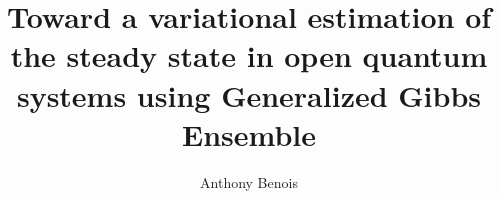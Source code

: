 \documentclass[%
 reprint,
 amsmath,amssymb,
 aps,
]{revtex4-2}
\begin{document}

\title{Toward a variational estimation of the steady state in open quantum systems using Generalized Gibbs Ensemble}


\author{Anthony Benois}




\maketitle



\newcommand{\trace}[1]{\ensuremath{\mathrm{Tr}\left( #1 \right)}}
\newcommand{\gge}[1]{\ensuremath{\frac{{\rm e}^{#1}}{\trace{{\rm e}^{#1}}}}}
\newcommand{\norm}[1]{\ensuremath{\vert\vert\, #1 \,\vert\vert}}
\newcommand{\lindblad}[1]{\ensuremath{\mathcal{L} \, #1}}







\end{document}
